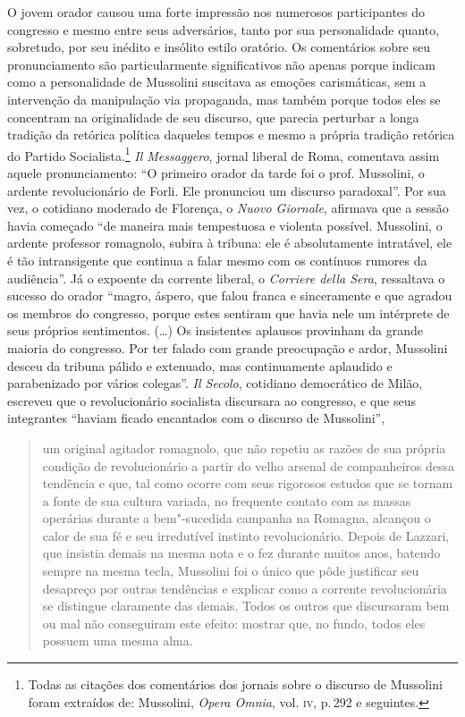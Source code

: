 O jovem orador causou uma forte impressão nos numerosos participantes do
congresso e mesmo entre seus adversários, tanto por sua personalidade
quanto, sobretudo, por seu inédito e insólito estilo oratório. Os
comentários sobre seu pronunciamento são particularmente significativos
não apenas porque indicam como a personalidade de Mussolini suscitava as
emoções carismáticas, sem a intervenção da manipulação via propaganda,
mas também porque todos eles se concentram na originalidade de seu
discurso, que parecia perturbar a longa tradição da retórica política
daqueles tempos e mesmo a própria tradição retórica do Partido
Socialista.\footnote{Todas as citações dos comentários dos jornais sobre
  o discurso de Mussolini foram extraídos de: Mussolini, \emph{Opera
  Omnia}, vol. \textsc{iv}, p.\,292 e seguintes.} \emph{Il Messaggero}, jornal
liberal de Roma, comentava assim aquele pronunciamento: ``O primeiro
orador da tarde foi o prof. Mussolini, o ardente revolucionário de
Forli. Ele pronunciou um discurso paradoxal''. Por sua vez, o cotidiano
moderado de Florença, o \emph{Nuovo Giornale}, afirmava que a sessão
havia começado ``de maneira mais tempestuosa e violenta possível.
Mussolini, o ardente professor romagnolo, subira à tribuna: ele é
absolutamente intratável, ele é tão intransigente que continua a falar
mesmo com os contínuos rumores da audiência''. Já o expoente da corrente
liberal, o \emph{Corriere della Sera}, ressaltava o sucesso do orador
``magro, áspero, que falou franca e sinceramente e que agradou os
membros do congresso, porque estes sentiram que havia nele um intérprete
de seus próprios sentimentos. (\ldots{}) Os insistentes aplausos provinham da
grande maioria do congresso. Por ter falado com grande preocupação e
ardor, Mussolini desceu da tribuna pálido e extenuado, mas continuamente
aplaudido e parabenizado por vários colegas''. \emph{Il Secolo},
cotidiano democrático de Milão, escreveu que o revolucionário socialista
discursara ao congresso, e que seus integrantes ``haviam ficado
encantados com o discurso de Mussolini'',

\begin{quote}
um original agitador romagnolo, que não repetiu as razões de sua própria
condição de revolucionário a partir do velho arsenal de companheiros
dessa tendência e que, tal como ocorre com seus rigorosos estudos que se
tornam a fonte de sua cultura variada, no frequente contato com as
massas operárias durante a bem"-sucedida campanha na Romagna, alcançou o
calor de sua fé e seu irredutível instinto revolucionário. Depois de
Lazzari, que insistia demais na mesma nota e o fez durante muitos anos,
batendo sempre na mesma tecla, Mussolini foi o único que pôde justificar
seu desapreço por outras tendências e explicar como a corrente
revolucionária se distingue claramente das demais. Todos os outros que
discursaram bem ou mal não conseguiram este efeito: mostrar que, no
fundo, todos eles possuem uma mesma alma.
\end{quote}

